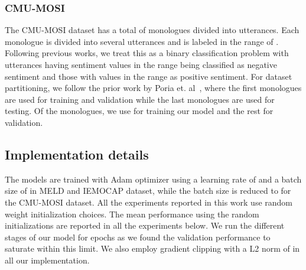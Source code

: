 \documentclass[lettersize,journal]{IEEEtran}
\begin{document}
\subsubsection{CMU-MOSI}
The CMU-MOSI dataset has a total of  monologues divided into  utterances. Each monologue is divided into several utterances and is labeled in the range of . Following previous works, we treat this as a binary classification problem with utterances having sentiment values in the range  being classified as negative sentiment and those with values in the range  as positive sentiment. For dataset partitioning, we follow the prior work by Poria et. al~\cite{poria2017context}, where the first   monologues are used for training and validation while the last  monologues are used for testing. Of the  monologues, we use  for training our model and the rest  for validation.
\begin{table}[t!]
\centering
\caption{Results on the different datasets in terms of weighted F1-score.}\label{tab:results}
    \vspace{-0.0in}


\end{table}
\subsection{Implementation details}\label{implement}


The models are trained with Adam optimizer using a learning rate of  and a batch size of  in MELD and IEMOCAP dataset, while the batch size is reduced to  for the CMU-MOSI dataset. All the experiments reported in this work use  random weight initialization choices. The mean performance using the random initializations are reported in all the experiments below. We run the different stages of our model for  epochs as we found the validation performance to saturate within this limit. We also employ gradient clipping with a L2 norm of  in all our implementation.
\end{document}
